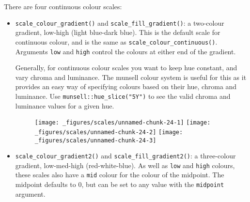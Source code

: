 There are four continuous colour scales:

\begin{itemize}
\item
  \texttt{scale\_colour\_gradient()} and
  \texttt{scale\_fill\_gradient()}: a two-colour gradient, low-high
  (light blue-dark blue). This is the default scale for continuous
  colour, and is the same as \texttt{scale\_colour\_continuous()}.
  Arguments \texttt{low} and \texttt{high} control the colours at either
  end of the gradient. 

  Generally, for continuous colour scales you want to keep hue constant,
  and vary chroma and luminance. The munsell colour system is useful for
  this as it provides an easy way of specifying colours based on their
  hue, chroma and luminance. Use \texttt{munsell::hue\_slice("5Y")} to
  see the valid chroma and luminance values for a given hue.

\begin{Shaded}
\begin{Highlighting}[]

\OperatorTok{+}\StringTok{ }\NormalTok{(} \NormalTok{, } \NormalTok{)}

\OperatorTok{+}\StringTok{ }\NormalTok{(}
  \OperatorTok{::}\NormalTok{(}\NormalTok{), }
  \OperatorTok{::}\NormalTok{(}\NormalTok{)}
\NormalTok{)}
\end{Highlighting}
\end{Shaded}

  \begin{figure}[H]
    \texttt{[image: \_figures/scales/unnamed-chunk-24-1]}%
    \texttt{[image: \_figures/scales/unnamed-chunk-24-2]}%
    \texttt{[image: \_figures/scales/unnamed-chunk-24-3]}
  \end{figure}
\item
  \texttt{scale\_colour\_gradient2()} and
  \texttt{scale\_fill\_gradient2()}: a three-colour gradient,
  low-med-high (red-white-blue). As well as \texttt{low} and
  \texttt{high} colours, these scales also have a \texttt{mid} colour
  for the colour of the midpoint. The midpoint defaults to 0, but can be
  set to any value with the \texttt{midpoint} argument.
   


\end{itemize}

